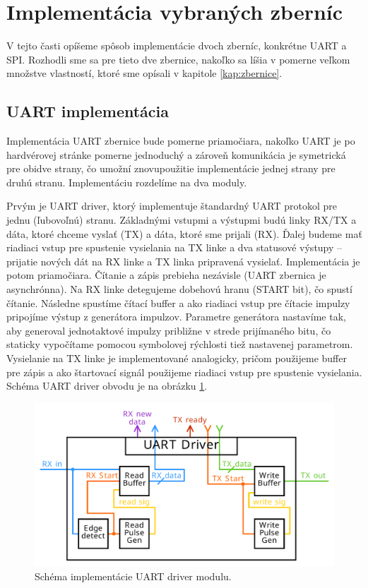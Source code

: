 \section{Implementácia vybraných zberníc}
V tejto časti opíšeme spôsob implementácie dvoch zberníc, konkrétne UART a SPI. Rozhodli sme sa pre tieto dve zbernice, nakoľko sa líšia v pomerne veľkom množstve vlastností, ktoré sme opísali v kapitole \ref{kap:zbernice}.

\subsection{UART implementácia}
Implementácia UART zbernice bude pomerne priamočiara, nakoľko UART je po hardvérovej stránke pomerne jednoduchý a zároveň komunikácia je symetrická pre obidve strany, čo umožní znovupoužitie implementácie jednej strany pre druhú stranu. Implementáciu rozdelíme na dva moduly.

Prvým je UART driver, ktorý implementuje štandardný UART protokol pre jednu (ľubovoľnú) stranu. Základnými vstupmi a výstupmi budú linky RX/TX a dáta, ktoré chceme vyslať (TX) a dáta, ktoré sme prijali (RX). Ďalej budeme mať riadiaci vstup pre spustenie vysielania na TX linke a dva statusové výstupy -- prijatie nových dát na RX linke a TX linka pripravená vysielať. Implementácia je potom priamočiara. Čítanie a zápis prebieha nezávisle (UART zbernica je asynchrónna). Na RX linke detegujeme dobehovú hranu (START bit), čo spustí čítanie. Následne spustíme čítací buffer a ako riadiaci vstup pre čítacie impulzy pripojíme výstup z generátora impulzov. Parametre generátora nastavíme tak, aby generoval jednotaktové impulzy približne v strede prijímaného bitu, čo staticky vypočítame pomocou symbolovej rýchlosti tiež nastavenej parametrom. Vysielanie na TX linke je implementované analogicky, pričom použijeme buffer pre zápis a ako štartovací signál použijeme riadiaci vstup pre spustenie vysielania. Schéma UART driver obvodu je na obrázku \ref{obr:uartDriver}.

\begin{figure}
    \centerline{\includegraphics[width=1\textwidth]{images/designs/uartDriver.pdf}}
    \caption[Schéma implementácie UART driver modulu]{Schéma implementácie UART driver modulu.}
    \label{obr:uartDriver}
\end{figure}

